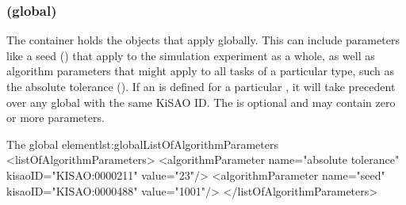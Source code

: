 \begin{blockChanged}
\subsubsection{ (global)}
\label{class:globalListOfAlgorithmParameters}
The  container holds the \AlgorithmParameter objects that apply globally.  This can include parameters like a seed () that apply to the simulation experiment as a whole, as well as algorithm parameters that might apply to all tasks of a particular type, such as the absolute tolerance ().  If an \AlgorithmParameter is defined for a particular \Simulation, it will take precedent over any global \AlgorithmParameter with the same KiSAO ID.  The  is optional and may contain zero or more parameters.

\begin{myXmlLst}{The global  element}{lst:globalListOfAlgorithmParameters}
<listOfAlgorithmParameters>
	<algorithmParameter name="absolute tolerance" kisaoID="KISAO:0000211" value="23"/> 
	<algorithmParameter name="seed" kisaoID="KISAO:0000488" value="1001"/> 
</listOfAlgorithmParameters>
\end{myXmlLst}
\end{blockChanged}

